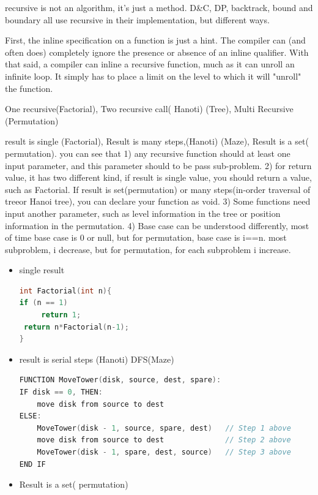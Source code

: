 \documentclass[a4paper,11pt,twoside]{book}
\begin{document}
	\par recursive is not an algorithm, it's just a method. D\&C, DP, backtrack, bound and boundary all use recursive in their implementation, but different ways. 
	
	\par First, the inline specification on a function is just a hint. The compiler can (and often does) completely ignore the presence or absence of an inline qualifier. With that said, a compiler can inline a recursive function, much as it can unroll an infinite loop. It simply has to place a limit on the level to which it will "unroll" the function.

	\par One recursive(Factorial),  Two recursive call( Hanoti) (Tree), Multi Recursive (Permutation)

	\par result is single (Factorial), Result is many steps,(Hanoti) (Maze), Result is a set( permutation). you can see that 1) any recursive function should at least one input parameter, and this parameter should to be pass sub-problem. 2) for return value, it has two different kind, if result is single value, you should return a value, such as Factorial. If result is set(permutation) or many steps(in-order traversal of treeor Hanoi tree), you can declare your function as void. 3) Some functions need input another parameter, such as level information in the tree or position information in the permutation. 4) Base case can be understood differently, most of time base case is 0 or null, but for permutation, base case is i==n.  most subproblem, i decrease, but for permutation, for each subproblem i increase. 
	
\begin{itemize}
\item single result 
\begin{lstlisting}[frame=single, language=c++]
int Factorial(int n){
if (n == 1) 
     return 1;
 return n*Factorial(n-1);
}
\end{lstlisting}

	\item result is serial steps (Hanoti) DFS(Maze)
\begin{lstlisting}[frame=single, language=c++]
FUNCTION MoveTower(disk, source, dest, spare):
IF disk == 0, THEN:
    move disk from source to dest
ELSE:
    MoveTower(disk - 1, source, spare, dest)   // Step 1 above
    move disk from source to dest              // Step 2 above
    MoveTower(disk - 1, spare, dest, source)   // Step 3 above
END IF
\end{lstlisting}

	\item  Result is a set( permutation)

\end{itemize}
\end{document}

